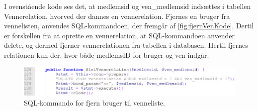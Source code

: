 I ovenstående kode ses det, at medlemsid og ven_medlemsid indsættes i tabellen Vennerelation, hvorved der dannes en vennerelation. Fjernes en bruger fra vennelisten, anvendes SQL-kommandoen, der fremgår af \autoref{fig:fjernVenKode}. Dertil er forskellen fra at oprette en vennerelation, at SQL-kommandoen anvender delete, og dermed fjerner vennerelationen fra tabellen i databasen. Hertil fjernes relationen kun der, hvor både medlemsID for bruger og ven indgår. 

\begin{figure} [H]
\centering
\includegraphics[width=1\textwidth]{figures/imple/fjernVenKode}
\caption{SQL-kommando for fjern bruger til venneliste.}
\label{fig:fjernVenKode}
\end{figure}

